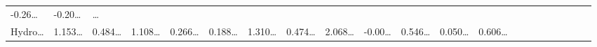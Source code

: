 \documentclass[
]{article}
\begin{document}
\begin{longtable}[]{@{}lllllllllllllllllllll@{}}
\begin{minipage}[t]{0.03\columnwidth}
-0.26\ldots{}\strut
\end{minipage} & \begin{minipage}[t]{0.03\columnwidth}\raggedright
-0.20\ldots{}\strut
\end{minipage} & \begin{minipage}[t]{0.01\columnwidth}\raggedright
\ldots{}\strut
\end{minipage}\tabularnewline
\begin{minipage}[t]{0.03\columnwidth}\raggedright
Hydro\ldots{}\strut
\end{minipage} & \begin{minipage}[t]{0.03\columnwidth}\raggedright
1.153\ldots{}\strut
\end{minipage} & \begin{minipage}[t]{0.03\columnwidth}\raggedright
0.484\ldots{}\strut
\end{minipage} & \begin{minipage}[t]{0.03\columnwidth}\raggedright
1.108\ldots{}\strut
\end{minipage} & \begin{minipage}[t]{0.03\columnwidth}\raggedright
0.266\ldots{}\strut
\end{minipage} & \begin{minipage}[t]{0.03\columnwidth}\raggedright
0.188\ldots{}\strut
\end{minipage} & \begin{minipage}[t]{0.03\columnwidth}\raggedright
1.310\ldots{}\strut
\end{minipage} & \begin{minipage}[t]{0.03\columnwidth}\raggedright
0.474\ldots{}\strut
\end{minipage} & \begin{minipage}[t]{0.03\columnwidth}\raggedright
2.068\ldots{}\strut
\end{minipage} & \begin{minipage}[t]{0.03\columnwidth}\raggedright
-0.00\ldots{}\strut
\end{minipage} & \begin{minipage}[t]{0.03\columnwidth}\raggedright
0.546\ldots{}\strut
\end{minipage} & \begin{minipage}[t]{0.03\columnwidth}\raggedright
0.050\ldots{}\strut
\end{minipage} & \begin{minipage}[t]{0.03\columnwidth}\raggedright
0.606\ldots{}\strut
\end{minipage} & \begin{minipage}[t]{0.03\columnwidth}\raggedright

\end{minipage}
\end{longtable}
\end{document}
